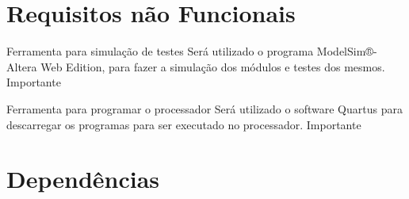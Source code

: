 \documentclass{article}
\begin{document}
\section{Requisitos não Funcionais}

  \begin{nonfunctional}
    
    \requirement
    {Ferramenta para simulação de testes}
    {Será utilizado o programa ModelSim®-Altera Web Edition, para fazer a simulação dos módulos e testes dos mesmos.}
    {Importante}   
    
    \requirement
    {Ferramenta para programar o processador}
    {Será utilizado o software Quartus para descarregar os programas para ser executado no processador.}
    {Importante}
    
  \end{nonfunctional}

\section{Dependências}

  \begin{dependencies}
\end{dependencies}  

% 
% 
\end{document}
